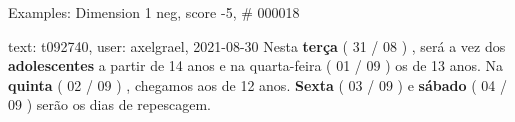 \begin{frame}{Examples: Dimension 1 neg, score -5, \# 000018}
\footnotesize
\begin{alertblock}{text: t092740, user: axelgrael, 2021-08-30}
Nesta \textbf{terça} ( 31 / 08 ) , será a vez dos \textbf{adolescentes} a 
partir de 14 anos e na quarta-feira ( 01 / 09 ) os de 13 anos. Na 
\textbf{quinta} ( 02 / 09 ) , chegamos aos de 12 anos. \textbf{Sexta} ( 03 / 09 
) e \textbf{sábado} ( 04 / 09 ) serão os dias de repescagem. 
\end{alertblock}
\end{frame}
